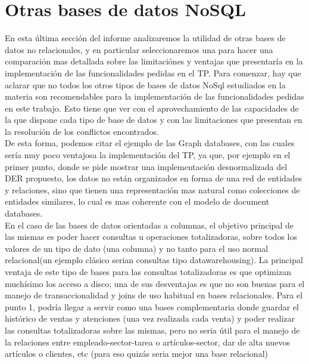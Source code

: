 \section{Otras bases de datos NoSQL}

En esta \'ultima secci\'on del informe analizaremos la utilidad de otras bases de datos no relacionales, y en particular seleccionaremos una para hacer una comparaci\'on mas detallada sobre las limitaci\'ones y ventajas que presentar\'ia en la implementaci\'on de las funcionalidades pedidas en el TP. Para comenzar, hay que aclarar que no todos los otros tipos de bases de datos NoSql estudiados en la materia son recomendables para la implementaci\'on de las funcionalidades pedidas en este trabajo. Esto tiene que ver con el aprovechamiento de las capacidades de la que dispone cada tipo de base de datos y con las limitaciones que presentan en la resoluci\'on de los conflictos encontrados. \\

De esta forma, podemos citar el ejemplo de las Graph databases, con las cuales ser\'ia muy poco ventajosa la implementaci\'on del TP, ya que, por ejemplo en el primer punto, donde se pide mostrar una implementaci\'on desnormalizada del DER propuesto, los datos no est\'an organizados en forma de una red de entidades y relaciones, sino que tienen una representaci\'on mas natural como colecciones de entidades similares, lo cual es mas coherente con el modelo de document databases.\\

En el caso de las bases de datos orientadas a columnas, el objetivo principal de las mismas es poder hacer consultas u operaciones totalizadoras, sobre todos los valores de un tipo de dato (una columna) y no tanto para el uso normal relacional(un ejemplo clásico serian consultas tipo datawarehousing). La principal ventaja de este tipo de bases para las consultas totalizadoras es que optimizan muchísimo los acceso a disco; una de sus desventajas es que no son buenas para el manejo de transaccionalidad y joins de uso habitual en bases relacionales.
Para el punto 1, podría llegar a servir como una bases complementaria donde guardar el histórico de ventas y atenciones (una vez realizada cada venta) y poder realizar las consultas totalizadoras sobre las mismas, pero no seria útil para el manejo de la relaciones entre empleado-sector-tarea o artículos-sector, dar de alta nuevos artículos o clientes, etc (para eso quizás seria mejor una base relacional) \\

